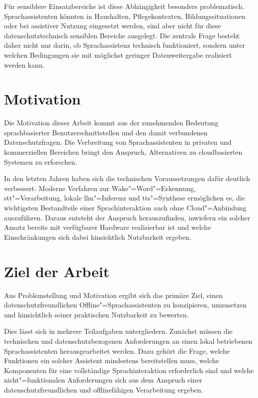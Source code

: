 Für sensiblere Einsatzbereiche ist diese Abhängigkeit besonders problematisch. Sprachassistenten könnten in Haushalten, Pflegekontexten, Bildungssituationen oder bei assistiver Nutzung eingesetzt werden, sind aber nicht für diese datenschutztechnisch sensiblen Bereiche ausgelegt. Die zentrale Frage besteht daher nicht nur darin, ob Sprachassistenz technisch funktioniert, sondern unter welchen Bedingungen sie mit möglichst geringer Datenweitergabe realisiert werden kann.


\section{Motivation}
\label{sec:Motivation}
Die Motivation dieser Arbeit kommt aus der zunehmenden Bedeutung sprachbasierter Benutzerschnittstellen und den damit verbundenen Datenschutzfragen. Die Verbreitung von Sprachassistenten in privaten und kommerziellen Bereichen bringt den Anspruch, Alternativen zu cloudbasierten Systemen zu erforschen.

In den letzten Jahren haben sich die technischen Voraussetzungen dafür deutlich verbessert. Moderne Verfahren zur Wake"=Word"=Erkennung, \gls{stt}"=Verarbeitung, lokale \gls{llm}"=Inferenz und \gls{tts}"=Synthese ermöglichen es, die wichtigsten Bestandteile einer Sprachinteraktion auch ohne Cloud"=Anbindung auszuführen. Daraus entsteht der Anspruch herauszufinden, inwiefern ein solcher Ansatz bereits mit verfügbarer Hardware realisierbar ist und welche Einschränkungen sich dabei hinsichtlich Nutzbarkeit ergeben.


\section{Ziel der Arbeit}
\label{sec:Ziel_der_Arbeit}
Aus Problemstellung und Motivation ergibt sich das primäre Ziel, einen datenschutzfreundlichen Offline"=Sprachassistenten zu konzipieren, umzusetzen und hinsichtlich seiner praktischen Nutzbarkeit zu bewerten.

Dies lässt sich in mehrere Teilaufgaben untergliedern. Zunächst müssen die technischen und datenschutzbezogenen Anforderungen an einen lokal betriebenen Sprachassistenten herausgearbeitet werden. Dazu gehört die Frage, welche Funktionen ein solcher Assistent mindestens bereitstellen muss, welche Komponenten für eine vollständige Sprachinteraktion erforderlich sind und welche nicht"=funktionalen Anforderungen sich aus dem Anspruch einer datenschutzfreundlichen und offlinefähigen Verarbeitung ergeben.

